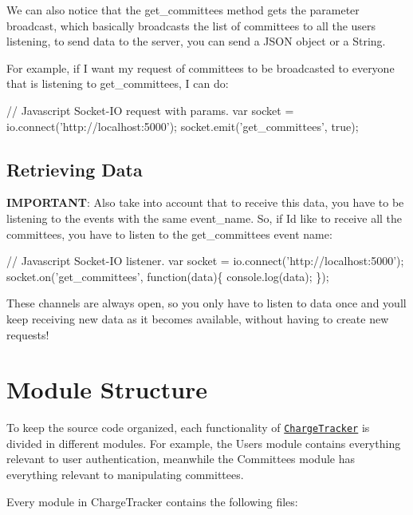 We can also notice that the {\ttfamily get\+\_\+committees} method gets the parameter broadcast, which basically broadcasts the list of committees to all the users listening, to send data to the server, you can send a J\+S\+ON object or a String.

For example, if I want my request of committees to be broadcasted to everyone that is listening to {\ttfamily get\+\_\+committees}, I can do\+:


\begin{DoxyCode}
// Javascript Socket-IO request with params.
var socket = io.connect('http://localhost:5000');
socket.emit('get\_committees', true);
\end{DoxyCode}
\hypertarget{index_retrieveData}{}\subsection{Retrieving Data}\label{index_retrieveData}
{\bfseries I\+M\+P\+O\+R\+T\+A\+NT}\+: Also take into account that to receive this data, you have to be listening to the events with the same event\+\_\+name. So, if I\textquotesingle{}d like to receive all the committees, you have to listen to the {\ttfamily get\+\_\+committees} event name\+:


\begin{DoxyCode}
// Javascript Socket-IO listener.
var socket = io.connect('http://localhost:5000');
socket.on('get\_committees', function(data)\{
    console.log(data);
\});
\end{DoxyCode}


These channels are always open, so you only have to listen to data once and you\textquotesingle{}ll keep receiving new data as it becomes available, without having to create new requests!\hypertarget{index_modulestruct}{}\section{Module Structure}\label{index_modulestruct}
To keep the source code organized, each functionality of \href{https://github.com/ritstudentgovernment/chargeflask}{\tt Charge\+Tracker} is divided in different modules. For example, the Users module contains everything relevant to user authentication, meanwhile the Committees module has everything relevant to manipulating committees.

Every module in Charge\+Tracker contains the following files\+:



